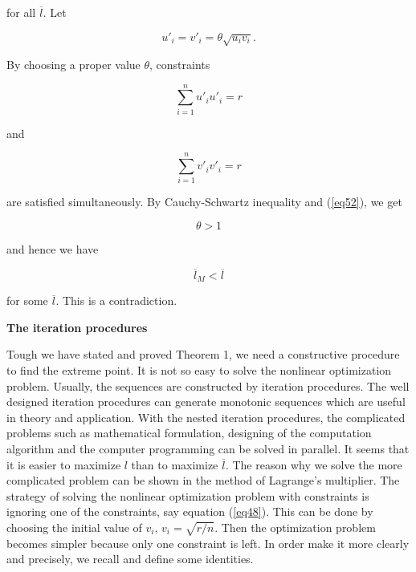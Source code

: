 \documentclass [18pt]{article}
\begin{document}
\noindent
for all $\overline l $. Let


\begin{equation}
\label{eq54}
u'_i = v'_i = \theta \sqrt {u_i v_i } .
\end{equation}



By choosing a proper value $\theta $, constraints


\begin{equation}
\label{eq55}
\sum\limits_{i = 1}^n {u'_i } u'_i = r
\end{equation}



\noindent
and


\begin{equation}
\label{eq56}
\sum\limits_{i = 1}^n {v'_i } v'_i = r
\end{equation}



\noindent
are satisfied simultaneously. By Cauchy-Schwartz inequality and (\ref{eq52}), we get


\begin{equation}
\label{eq57}
\theta > 1
\end{equation}



\noindent
and hence we have


\begin{equation}
\label{eq58}
\overline l _M < \overline l
\end{equation}



\noindent
for some $\overline l $. This is a contradiction.

\textbf{The iteration procedures }

Tough we have stated and proved Theorem 1, we need a constructive procedure
to find the extreme point. It is not so easy to solve the nonlinear
optimization problem. Usually, the sequences are constructed by iteration
procedures. The well designed iteration procedures can generate monotonic
sequences which are useful in theory and application. With the nested
iteration procedures, the complicated problems such as mathematical
formulation, designing of the computation algorithm and the computer
programming can be solved in parallel. It seems that it is easier to
maximize $l$ than to maximize $\overline l $. The reason why we solve the
more complicated problem can be shown in the method of Lagrange's
multiplier. The strategy of solving the nonlinear optimization problem with
constraints is ignoring one of the constraints, say equation (\ref{eq48}). This can
be done by choosing the initial value of $v_i $, $v_i = \sqrt {r / n} $.
Then the optimization problem becomes simpler because only one constraint is
left. In order make it more clearly and precisely, we recall and define some
identities.
\end{document}
